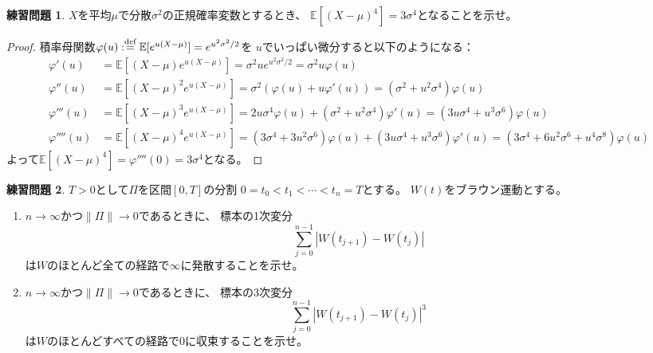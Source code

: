 \documentclass[uplatex]{jsarticle}
\theoremstyle{definition}
\newtheorem{prob}[prob]{練習問題}
\def\E{\mathbb{E}}
\def\dfn{:\overset{\mbox{{\scriptsize def}}}{=}}
\begin{document}
\begin{prob}\label{prob: 3.3}
  \(X\)を平均\(\mu\)で分散\(\sigma^2\)の正規確率変数とするとき、
  \(\E[(X-\mu)^4] = 3\sigma^4\)となることを示せ。
\end{prob}

\begin{proof}
  積率母関数\(\varphi(u) \dfn \E[e^{u(X-\mu)}] = e^{u^2\sigma^2/2}\)を
  \(u\)でいっぱい微分すると以下のようになる：
  \begin{align*}
    \varphi'(u) &= \E[(X-\mu)e^{u(X-\mu)}]
    = \sigma^2ue^{u^2\sigma^2/2}
    = \sigma^2u\varphi(u) \\
    \varphi''(u) &= \E[(X-\mu)^2e^{u(X-\mu)}]
    = \sigma^2(\varphi(u) + u\varphi'(u))
    = (\sigma^2 + u^2\sigma^4)\varphi(u) \\
    \varphi'''(u) &= \E[(X-\mu)^3e^{u(X-\mu)}]
    = 2u\sigma^4\varphi(u) + (\sigma^2 + u^2\sigma^4)\varphi'(u)
    = (3u\sigma^4 + u^3\sigma^6)\varphi(u) \\
    \varphi''''(u) &= \E[(X-\mu)^4e^{u(X-\mu)}]
    = (3\sigma^4 + 3u^2\sigma^6)\varphi(u)
    + (3u\sigma^4 + u^3\sigma^6)\varphi'(u)
    = (3\sigma^4 + 6u^2\sigma^6 + u^4\sigma^8)\varphi(u)
  \end{align*}
  よって\(\E[(X-\mu)^4] = \varphi''''(0) = 3\sigma^4\)となる。
\end{proof}


\begin{prob}\label{prob: 3.4}
  \(T > 0\)として\(\Pi\)を区間\([0,T]\)の分割
  \(0=t_0 < t_1 < \cdots < t_n = T\)とする。
  \(W(t)\)をブラウン運動とする。
  \begin{enumerate}
    \item \label{enumi: 3.4-1}
    \(n\to \infty\)かつ\(\| \Pi\| \to 0\)であるときに、
    標本の1次変分
    \[
    \sum_{j=0}^{n-1}|W(t_{j+1})-W(t_j)|
    \]
    は\(W\)のほとんど全ての経路で\(\infty\)に発散することを示せ。
    \item \label{enumi: 3.4-2}
    \(n\to \infty\)かつ\(\| \Pi\| \to 0\)であるときに、
    標本の3次変分
    \[
    \sum_{j=0}^{n-1}|W(t_{j+1})-W(t_j)|^3
    \]
    は\(W\)のほとんどすべての経路で\(0\)に収束することを示せ。
  \end{enumerate}
\end{prob}
\end{document}
